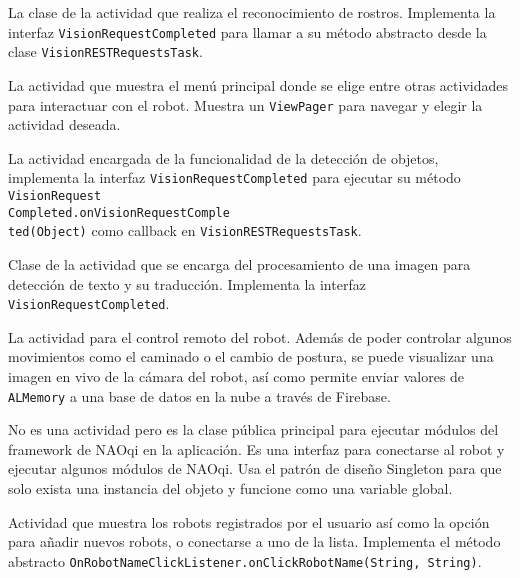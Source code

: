 
La clase de la actividad que realiza el reconocimiento de rostros. Implementa la interfaz \texttt{VisionRequestCompleted} para llamar a su método abstracto desde la clase \texttt{VisionRESTRequestsTask}.



La actividad que muestra el menú principal donde se elige entre otras actividades para interactuar con el robot. Muestra un \texttt{ViewPager} para navegar y elegir la actividad deseada.



La actividad encargada de la funcionalidad de la detección de objetos, implementa la interfaz \texttt{VisionRequestCompleted} para ejecutar su método \texttt{VisionRequest\\Completed.onVisionRequestComple\\ted(Object)} como callback en \texttt{VisionRESTRequestsTask}.




Clase de la actividad que se encarga del procesamiento de una imagen 
para detección de texto y su traducción. Implementa la interfaz 
\texttt{VisionRequestCompleted}.


La actividad para el control remoto del robot. Además de poder 
controlar algunos movimientos como el caminado o el cambio de postura, 
se puede visualizar una imagen en vivo de la cámara del robot, así 
como permite enviar valores de \texttt{ALMemory} a una base de datos en la nube 
a través de Firebase.


No es una actividad pero es la clase pública principal para ejecutar módulos del framework de NAOqi en la aplicación. Es una interfaz para conectarse al robot y ejecutar algunos módulos de NAOqi. Usa el patrón de diseño Singleton para que solo exista una instancia del objeto y funcione como una variable global.



Actividad que muestra los robots registrados por el usuario así como la opción para añadir nuevos robots, o conectarse a uno de la lista. Implementa el método abstracto \texttt{OnRobotNameClickListener.onClickRobotName(String, String)}.

